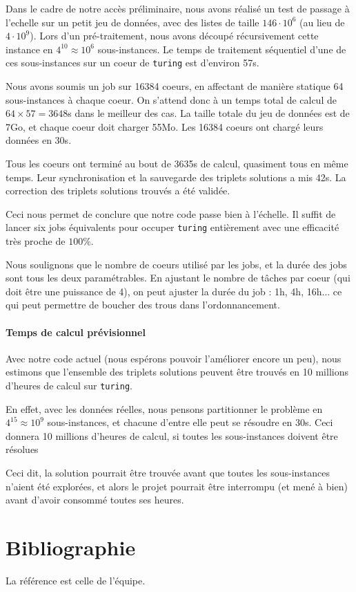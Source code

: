 \documentclass[
    a4paper, 
    12pt, onecolumn,
]{article}
\begin{document}
Dans le cadre de notre accès préliminaire, nous avons réalisé un test de passage
à l'echelle sur un petit jeu de données, avec des listes de taille
$146 \cdot 10^6$ (au lieu de $4\cdot 10^9$). Lors d'un pré-traitement, nous
avons découpé récursivement cette instance en $4^{10} \approx 10^6$
sous-instances. Le temps de traitement séquentiel d'une de ces sous-instances
sur un coeur de \texttt{turing} est d'environ 57s.

Nous avons soumis un job sur 16384 coeurs, en affectant de manière statique 64
sous-instances à chaque coeur. On s'attend donc à un temps total de calcul de
$64 \times 57 = 3648$s dans le meilleur des cas. La taille totale du jeu de
données est de 7Go, et chaque coeur doit charger 55Mo. Les 16384 coeurs ont
chargé leurs données en 30s.

Tous les coeurs ont terminé au bout de 3635s de calcul, quasiment tous en même
temps. Leur synchronisation et la sauvegarde des triplets solutions a mis
42s. La correction des triplets solutions trouvés a été validée.

Ceci nous permet de conclure que notre code passe bien à l'échelle. Il suffit de
lancer six jobs équivalents pour occuper \texttt{turing} entièrement avec une
efficacité très proche de $100\%$.

Nous soulignons que le nombre de coeurs utilisé par les jobs, et la durée des
jobs sont tous les deux paramétrables. En ajustant le nombre de tâches par
coeur (qui doit être une puissance de 4), on peut ajuster la durée du job : 1h,
4h, 16h... ce qui peut permettre de boucher des trous dans l'ordonnancement.

\paragraph{Temps de calcul prévisionnel}

Avec notre code actuel (nous espérons pouvoir l'améliorer encore un peu), nous
estimons que l'ensemble des triplets solutions peuvent être trouvés en 10
millions d'heures de calcul sur \texttt{turing}.

En effet, avec les données réelles, nous pensons partitionner le problème en
$4^{15} \approx 10^9$ sous-instances, et chacune d'entre elle peut se résoudre
en 30s. Ceci donnera 10 millions d'heures de calcul, si toutes les
sous-instances doivent être résolues

Ceci dit, \og la\fg{} solution pourrait être trouvée avant que toutes les
sous-instances n'aient été explorées, et alors le projet pourrait être
interrompu (et mené à bien) avant d'avoir consommé toutes ses heures.


\newpage\section{Bibliographie}
\label{Sec:Biblio}

La référence \protect\cite{BouillaguetDF18} est celle de l'équipe.



\end{document}
